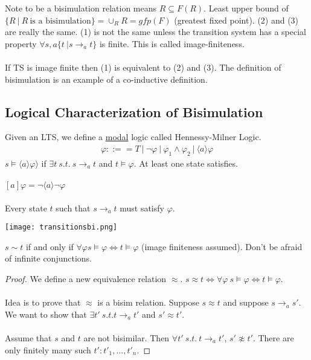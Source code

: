\documentclass[../598comp.tex]{subfiles}
\begin{document}
Note to be a bisimulation relation means $R \subseteq F(R)$. Least upper bound
of $\{R \ | \ R \ \text{is a bisimulation}\} = \cup_{R}R = gfp(F)$ (greatest
fixed point).
(2) and (3) are really the same. (1) is not the same unless the transition
system has a special property $\forall s, a \{t \ | s \to_a t\}$ is finite.
This is called image-finiteness.
\\\\
If TS is image finite then (1) is equivalent to (2) and (3). The definition of
bisimulation is an example of a co-inductive definition.

\subsection{Logical Characterization of Bisimulation}

Given an LTS, we define a \ul{modal} logic called Hennessy-Milner Logic.
\begin{gather*}
  \varphi ::== T \ | \ \neg \varphi \ | \ \varphi_1 \wedge \varphi_2 \ | \
  \langle  a \rangle \varphi 
\end{gather*}
$s \models \langle  a \rangle \varphi \rangle$ if $\exists t \ s.t. \ s \to_a t$
and $t \models \varphi$. At least one state satisfies.
\\\\
$[a]\varphi = \neg \langle  a \rangle \neg \varphi$
\\\\
Every state $t$ such that $s \to_a t$ must satisfy $\varphi$.

\texttt{[image: transitionsbi.png]}
\begin{theorem}
  $s \sim t$ if and only if $\forall \varphi s \models \varphi \iff t \models
  \varphi$ (image finiteness assumed). Don't be afraid of infinite conjunctions.
  \begin{proof}
    We define a new equivalence relation $\approx$. $s \approx t \iff \forall
    \varphi \ s \models \varphi \iff t \models \varphi$.
    \\\\
    Idea is to prove that $\approx$ is a bisim relation. Suppose $s \approx t$
    and suppose $s \to_a s'$. We want to show that $\exists t' \ s.t. t \to_a
    t'$ and $s' \approx t'$.
    \\\\
    Assume that $s$ and $t$ are not bisimilar. Then $\forall t' \ s.t. \ t \to_a
    t'$, $s' \not \approx t'$. There are only finitely many such $t': t'_1,
    \dots, t'_n$. %
  \end{proof}
\end{theorem}
\end{document}

